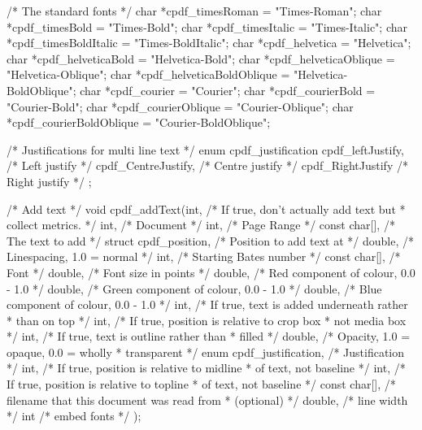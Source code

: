 /* The standard fonts */
char *cpdf_timesRoman = "Times-Roman";
char *cpdf_timesBold = "Times-Bold";
char *cpdf_timesItalic = "Times-Italic";
char *cpdf_timesBoldItalic = "Times-BoldItalic";
char *cpdf_helvetica = "Helvetica";
char *cpdf_helveticaBold = "Helvetica-Bold";
char *cpdf_helveticaOblique = "Helvetica-Oblique";
char *cpdf_helveticaBoldOblique = "Helvetica-BoldOblique";
char *cpdf_courier = "Courier";
char *cpdf_courierBold = "Courier-Bold";
char *cpdf_courierOblique = "Courier-Oblique";
char *cpdf_courierBoldOblique = "Courier-BoldOblique";

/* Justifications for multi line text */
enum cpdf_justification {
  cpdf_leftJustify,   /* Left justify */
  cpdf_CentreJustify, /* Centre justify */
  cpdf_RightJustify   /* Right justify */
};

/* Add text */
void cpdf_addText(int,                  /* If true, don't actually add text but
                                         * collect metrics. */
                  int,                  /* Document */
                  int,                  /* Page Range */
                  const char[],         /* The text to add */
                  struct cpdf_position, /* Position to add text at */
                  double,               /* Linespacing, 1.0 = normal */
                  int,                  /* Starting Bates number */
                  const char[],         /* Font */
                  double,               /* Font size in points */
                  double,               /* Red component of colour, 0.0 - 1.0 */
                  double, /* Green component of colour, 0.0 - 1.0 */
                  double, /* Blue component of colour, 0.0 - 1.0 */
                  int,    /* If true, text is added underneath rather
                           * than on top */
                  int,    /* If true, position is relative to crop box
                           * not media box */
                  int,    /* If true, text is outline rather than
                           * filled */
                  double, /* Opacity, 1.0 = opaque, 0.0 = wholly
                           * transparent */
                  enum cpdf_justification, /* Justification */
                  int,          /* If true, position is relative to midline
                                 * of text, not baseline */
                  int,          /* If true, position is relative to topline
                                 * of text, not baseline */
                  const char[], /* filename that this document was read from
                                 * (optional) */
                  double,       /* line width */
                  int           /* embed fonts */
);

